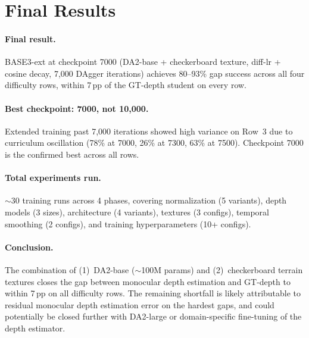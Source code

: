 \documentclass[11pt,a4paper]{article}
\begin{document}
\section{Final Results}

\paragraph{Final result.}
BASE3-ext at checkpoint 7000 (DA2-base + checkerboard texture, diff-lr +
cosine decay, 7{,}000 DAgger iterations) achieves 80--93\% gap success
across all four difficulty rows, within 7\,pp of the GT-depth student on
every row.

\paragraph{Best checkpoint: 7000, not 10{,}000.}
Extended training past 7{,}000 iterations showed high variance on Row~3
due to curriculum oscillation (78\% at 7000, 26\% at 7300, 63\% at 7500).
Checkpoint 7000 is the confirmed best across all rows.

\paragraph{Total experiments run.}  $\sim$30 training runs across 4 phases,
covering normalization (5 variants), depth models (3 sizes), architecture
(4 variants), textures (3 configs), temporal smoothing (2 configs), and
training hyperparameters (10+ configs).

\paragraph{Conclusion.}
The combination of (1)~DA2-base ($\sim$100M params) and (2)~checkerboard
terrain textures closes the gap between monocular depth estimation and
GT-depth to within 7\,pp on all difficulty rows.  The remaining shortfall
is likely attributable to residual monocular depth estimation error on
the hardest gaps, and could potentially be closed further with DA2-large
or domain-specific fine-tuning of the depth estimator.
\end{document}
